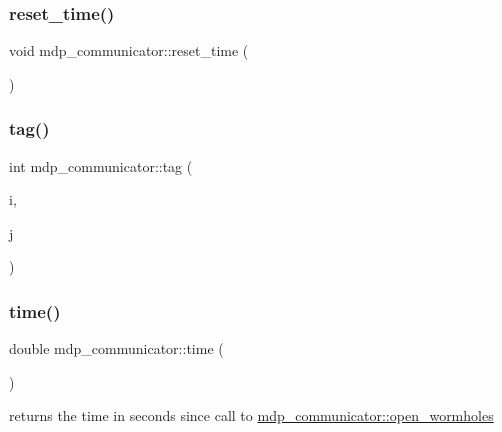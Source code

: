 \subsubsection{\texorpdfstring{reset\+\_\+time()}{reset\_time()}}
{\footnotesize\ttfamily void mdp\+\_\+communicator\+::reset\+\_\+time (\begin{DoxyParamCaption}{ }\end{DoxyParamCaption})\hspace{0.3cm}{\ttfamily [inline]}}

\mbox{\label{classmdp__communicator_a927db59c7ab066becc693d3b944d7dfa}} 
\subsubsection{\texorpdfstring{tag()}{tag()}}
{\footnotesize\ttfamily int mdp\+\_\+communicator\+::tag (\begin{DoxyParamCaption}\item[{int}]{i,  }\item[{int}]{j }\end{DoxyParamCaption})\hspace{0.3cm}{\ttfamily [inline]}}

\mbox{\label{classmdp__communicator_a7e725836b00c3485cd02b3ad001cf6dd}} 
\subsubsection{\texorpdfstring{time()}{time()}}
{\footnotesize\ttfamily double mdp\+\_\+communicator\+::time (\begin{DoxyParamCaption}{ }\end{DoxyParamCaption})\hspace{0.3cm}{\ttfamily [inline]}}



returns the time in seconds since call to \hyperlink{classmdp__communicator_af2c43869a689b8f1d020d4c4995b0cee}{mdp\+\_\+communicator\+::open\+\_\+wormholes} 

\mbox{\label{classmdp__communicator_ae63ed716fd7a459031dc2fc76da7c258}} 
